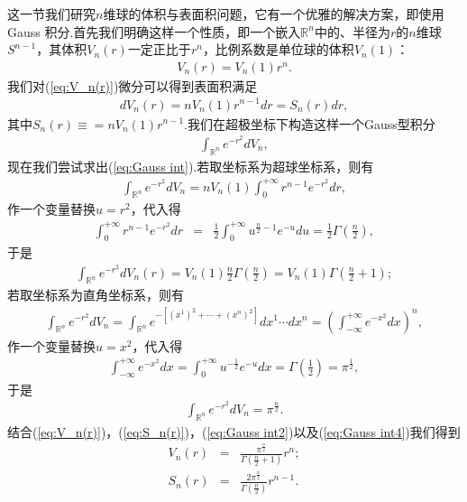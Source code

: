			这一节我们研究$n$维球的体积与表面积问题，它有一个优雅的解决方案，即使用Gauss 积分.首先我们明确这样一个性质，即一个嵌入$\mathbb{R}^n$中的、半径为$r$的$n$维球$S^{n-1}$，其体积$V_n(r)$一定正比于$r^n$，比例系数是单位球的体积$V_n(1)$：
			\begin{eqnarray}\label{eq:V_n(r)}
				V_n(r)=V_n(1)r^n. 
			\end{eqnarray}
			我们对(\ref{eq:V_n(r)})微分可以得到表面积满足
			\begin{eqnarray}\label{eq:S_n(r)}
				dV_n(r)=nV_n(1)r^{n-1}dr=S_n(r)dr, 
			\end{eqnarray}
			其中$S_n(r)\equiv =nV_n(1)r^{n-1}$.我们在超极坐标下构造这样一个Gauss型积分
			\begin{eqnarray}\label{eq:Gauss int}
				\int_{\mathbb{R}^n}e^{-r^2}dV_n,
			\end{eqnarray}
			现在我们尝试求出(\ref{eq:Gauss int}).若取坐标系为超球坐标系，则有
			\begin{eqnarray}\label{eq:Gauss int1}
				\int_{\mathbb{R}^n}e^{-r^2}dV_n=nV_n(1)\int_0^{+\infty}r^{n-1}e^{-r^2}dr,
			\end{eqnarray}
			作一个变量替换$u=r^2$，代入得
			\begin{eqnarray*}
				\int_0^{+\infty}r^{n-1}e^{-r^2}dr&=&\frac{1}{2}\int_0^{+\infty}u^{\frac{n}{2}-1}e^{-u}du=\frac{1}{2}\varGamma\left(\frac{n}{2}\right),
			\end{eqnarray*}
			于是
			\begin{eqnarray}\label{eq:Gauss int2}
				\int_{\mathbb{R}^n}e^{-r^2}dV_n(r)=V_n(1)\frac{n}{2}\varGamma\left(\frac{n}{2}\right)=V_n(1)\varGamma\left(\frac{n}{2}+1\right);
			\end{eqnarray}
			若取坐标系为直角坐标系，则有
			\begin{eqnarray}\label{eq:Gauss int3}
				\int_{\mathbb{R}^n}e^{-r^2}dV_n=\int_{\mathbb{R}^n}e^{-\left[(x^1)^2+\cdots+(x^n)^2\right]}dx^1\cdots dx^n=\left(\int_{-\infty}^{+\infty}e^{-x^2}dx\right)^n,
			\end{eqnarray}
			作一个变量替换$u=x^2$，代入得
			\begin{eqnarray*}
				\int_{-\infty}^{+\infty}e^{-x^2}dx=\int_{0}^{+\infty}u^{-\frac{1}{2}}e^{-u}dx=\varGamma\left(\frac{1}{2}\right)=\pi^{\frac{1}{2}},
			\end{eqnarray*}
			于是
			\begin{eqnarray}\label{eq:Gauss int4}
				\int_{\mathbb{R}^n}e^{-r^2}dV_n=\pi^{\frac{n}{2}}.
			\end{eqnarray}
			结合(\ref{eq:V_n(r)})，(\ref{eq:S_n(r)})，(\ref{eq:Gauss int2})以及(\ref{eq:Gauss int4})我们得到
			\begin{eqnarray}
				V_n(r)&=&\frac{\pi^{\frac{n}{2}}}{\varGamma\left(\frac{n}{2}+1\right)}r^n;\\
				S_n(r)&=&\frac{2\pi^{\frac{n}{2}}}{\varGamma\left(\frac{n}{2}\right)}r^{n-1}.
			\end{eqnarray}


			